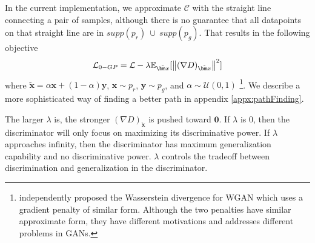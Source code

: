 \documentclass{article} %
\begin{document}
In the current implementation, we approximate $\mathcal{C}$ with the straight line connecting a pair of samples, although there is no guarantee that all datapoints on that straight line are in $supp(p_r)\ \cup\ supp(p_g)$. That results in the following objective
\begin{equation}
\mathcal{L}_{0-GP} = \mathcal{L} - \lambda \mathbb{E}_{\tilde{\bm x}}[\norm{(\nabla D)_{\tilde{\bm x}}}^2] \label{eqn:l0gp}
\end{equation}
where $\tilde{\bm x} = \alpha \bm x + (1 - \alpha) \bm y$, $\bm x \sim p_r$, $\bm y \sim p_g$, and $\alpha \sim \mathcal{U}(0, 1)$ \footnote{\cite{wassersteinDiv} independently proposed the Wasserstein divergence for WGAN which uses a gradient penalty of similar form. Although the two penalties have similar approximate form, they have different motivations and addresses different problems in GANs.}. We describe a more sophisticated way of finding a better path in appendix \ref{appx:pathFinding}.

The larger $\lambda$ is, the stronger $(\nabla D)_{\tilde{\bm x}}$ is pushed toward $\bm 0$. If $\lambda$ is 0, then the discriminator will only focus on maximizing its discriminative power. If $\lambda$ approaches infinity, then the discriminator has maximum generalization capability and no discriminative power. $\lambda$ controls the tradeoff between discrimination and generalization in the discriminator. 
\end{document}
